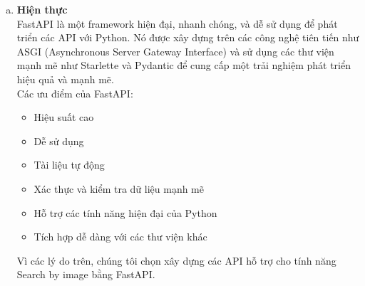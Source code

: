 \begin{enumerate}[a.]
\begin{enumerate}[1.]
    \newpage
    \item Retrieved Images: Lấy ra các khoảng cách có giá trị thấp nhất, từ đó lấy được các ảnh và sản phẩm tương đồng với ảnh người dùng cung cấp
\end{enumerate}
\item \textbf{Hiện thực}\\
\noindent FastAPI là một framework hiện đại, nhanh chóng, và dễ sử dụng để phát triển các API với Python. Nó được xây dựng trên các công nghệ tiên tiến như ASGI (Asynchronous Server Gateway Interface) và sử dụng các thư viện mạnh mẽ như Starlette và Pydantic để cung cấp một trải nghiệm phát triển hiệu quả và mạnh mẽ.\\
Các ưu điểm của FastAPI:
\begin{itemize}
    \item Hiệu suất cao
    \item Dễ sử dụng
    \item Tài liệu tự động
    \item Xác thực và kiểm tra dữ liệu mạnh mẽ
    \item Hỗ trợ các tính năng hiện đại của Python
    \item Tích hợp dễ dàng với các thư viện khác
\end{itemize}
Vì các lý do trên, chúng tôi chọn xây dựng các API hỗ trợ cho tính năng Search by image bằng FastAPI.


\end{enumerate}








